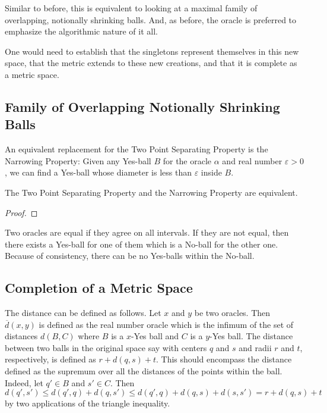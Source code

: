 Similar to before, this is equivalent to looking at a maximal family of overlapping, notionally shrinking balls. And, as before, the oracle is preferred to emphasize the algorithmic nature of it all. 

One would need to establish that the singletons represent themselves in this new space, that the metric extends to these new creations, and that it is complete as a metric space.



\subsection{Family of Overlapping Notionally Shrinking Balls}

An equivalent replacement for the Two Point Separating Property is the Narrowing Property: Given any Yes-ball $B$ for the oracle $\alpha$ and real number $\varepsilon >0$, we can find a Yes-ball whose diameter is less than $\varepsilon$ inside $B$.

\begin{proposition}
    The Two Point Separating Property and the Narrowing Property are equivalent.
\end{proposition}

\begin{proof}
    
\end{proof}


Two oracles are equal if they agree on all intervals. If they are not equal, then there exists a Yes-ball for one of them which is a No-ball for the other one. Because of consistency, there can be no Yes-balls within the No-ball. 


\subsection{Completion of a Metric Space}



The distance can be defined as follows. Let $x$ and $y$ be two oracles. Then $\overline{d}(x,y)$ is defined as the real number oracle which is the infimum of the set of distances $d(B, C)$ where $B$ is a $x$-Yes ball and $C$ is a $y$-Yes ball. The distance between two balls in the original space say with centers $q$ and $s$ and radii $r$ and $t$, respectively, is defined as $r + d(q,s) + t$. This should encompass the distance defined as the supremum over all the distances of the points within the ball. Indeed, let $q' \in B$ and $s'\in C$. Then $d(q', s') \leq d(q',q) + d(q,s') \leq d(q',q) + d(q,s) + d(s,s') = r + d(q,s) + t$ by two applications of the triangle inequality.  


